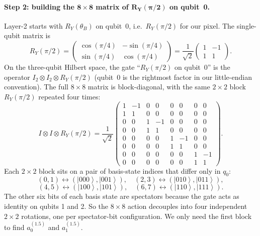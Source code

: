 \documentclass[11pt]{article}
\newcommand{\ket}[1]{\left| #1 \right\rangle}
\begin{document}
\paragraph{Step 2: building the $\mathbf{8 \times 8}$ matrix of $\mathbf{R_Y(\pi/2)}$ on qubit~0.} Layer-2 starts with $R_Y(\theta_B)$ on qubit~0, i.e.\ $R_Y(\pi/2)$ for our pixel. The single-qubit matrix is
\[
R_Y(\pi/2) = \begin{pmatrix} \cos(\pi/4) & -\sin(\pi/4) \\ \sin(\pi/4) & \cos(\pi/4) \end{pmatrix} = \frac{1}{\sqrt{2}}\begin{pmatrix} 1 & -1 \\ 1 & 1 \end{pmatrix}.
\]
On the three-qubit Hilbert space, the gate ``$R_Y(\pi/2)$ on qubit~0'' is the operator $I_2 \otimes I_2 \otimes R_Y(\pi/2)$ (qubit~0 is the rightmost factor in our little-endian convention). The full $8 \times 8$ matrix is block-diagonal, with the same $2 \times 2$ block $R_Y(\pi/2)$ repeated four times:
\[
I \otimes I \otimes R_Y(\pi/2) =
\frac{1}{\sqrt{2}}\!\!
\left(\begin{array}{cc|cc|cc|cc}
1 & -1 & 0 & 0 & 0 & 0 & 0 & 0 \\
1 & 1 & 0 & 0 & 0 & 0 & 0 & 0 \\ \hline
0 & 0 & 1 & -1 & 0 & 0 & 0 & 0 \\
0 & 0 & 1 & 1 & 0 & 0 & 0 & 0 \\ \hline
0 & 0 & 0 & 0 & 1 & -1 & 0 & 0 \\
0 & 0 & 0 & 0 & 1 & 1 & 0 & 0 \\ \hline
0 & 0 & 0 & 0 & 0 & 0 & 1 & -1 \\
0 & 0 & 0 & 0 & 0 & 0 & 1 & 1
\end{array}\right).
\]
Each $2 \times 2$ block sits on a pair of basis-state indices that differ only in $q_0$:
\[
(0, 1) \leftrightarrow (\ket{000}, \ket{001}), \quad
(2, 3) \leftrightarrow (\ket{010}, \ket{011}),
\]
\[
(4, 5) \leftrightarrow (\ket{100}, \ket{101}), \quad
(6, 7) \leftrightarrow (\ket{110}, \ket{111}).
\]
The other six bits of each basis state are spectators because the gate acts as identity on qubits 1 and 2. So the $8 \times 8$ action decouples into four independent $2 \times 2$ rotations, one per spectator-bit configuration. We only need the first block to find $a^{(1.5)}_0$ and $a^{(1.5)}_1$.
\end{document}
